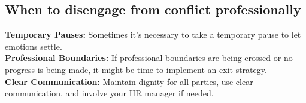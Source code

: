 \documentclass[12pt]{article}
\begin{document}
\subsection{When to disengage from conflict professionally}
\textbf{Temporary Pauses:}  Sometimes it's necessary to take a temporary pause to let emotions settle.\\
\textbf{Professional Boundaries:}  If professional boundaries are being crossed or no progress is being made, it might be time to implement an exit strategy.\\
\textbf{Clear Communication:}  Maintain dignity for all parties, use clear communication, and involve your HR manager if needed.
\end{document}
